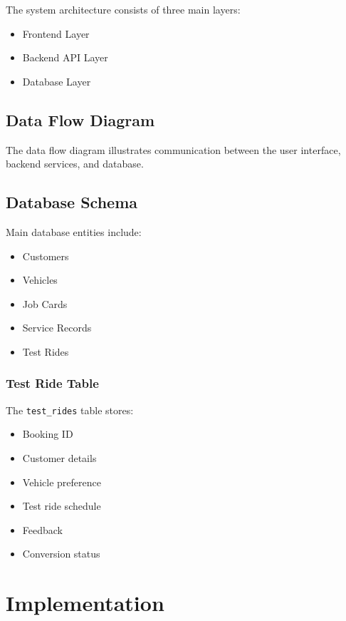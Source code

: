 \documentclass[12pt,a4paper]{report}
\begin{document}
The system architecture consists of three main layers:

\begin{itemize}
\item Frontend Layer
\item Backend API Layer
\item Database Layer
\end{itemize}

\section{Data Flow Diagram}

The data flow diagram illustrates communication between the user interface, backend services, and database.

\section{Database Schema}

Main database entities include:

\begin{itemize}
\item Customers
\item Vehicles
\item Job Cards
\item Service Records
\item Test Rides
\end{itemize}

\subsection{Test Ride Table}

The \texttt{test\_rides} table stores:

\begin{itemize}
\item Booking ID
\item Customer details
\item Vehicle preference
\item Test ride schedule
\item Feedback
\item Conversion status
\end{itemize}

\chapter{Implementation}
\end{document}
